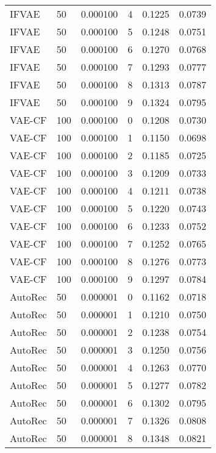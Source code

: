 \begin{tabular}{llrlrr}
   IFVAE &   50 &  0.000100 &     4 &  0.1225 &       0.0739 \\
   IFVAE &   50 &  0.000100 &     5 &  0.1248 &       0.0751 \\
   IFVAE &   50 &  0.000100 &     6 &  0.1270 &       0.0768 \\
   IFVAE &   50 &  0.000100 &     7 &  0.1293 &       0.0777 \\
   IFVAE &   50 &  0.000100 &     8 &  0.1313 &       0.0787 \\
   IFVAE &   50 &  0.000100 &     9 &  0.1324 &       0.0795 \\
  VAE-CF &  100 &  0.000100 &     0 &  0.1208 &       0.0730 \\
  VAE-CF &  100 &  0.000100 &     1 &  0.1150 &       0.0698 \\
  VAE-CF &  100 &  0.000100 &     2 &  0.1185 &       0.0725 \\
  VAE-CF &  100 &  0.000100 &     3 &  0.1209 &       0.0733 \\
  VAE-CF &  100 &  0.000100 &     4 &  0.1211 &       0.0738 \\
  VAE-CF &  100 &  0.000100 &     5 &  0.1220 &       0.0743 \\
  VAE-CF &  100 &  0.000100 &     6 &  0.1233 &       0.0752 \\
  VAE-CF &  100 &  0.000100 &     7 &  0.1252 &       0.0765 \\
  VAE-CF &  100 &  0.000100 &     8 &  0.1276 &       0.0773 \\
  VAE-CF &  100 &  0.000100 &     9 &  0.1297 &       0.0784 \\
 AutoRec &   50 &  0.000001 &     0 &  0.1162 &       0.0718 \\
 AutoRec &   50 &  0.000001 &     1 &  0.1210 &       0.0750 \\
 AutoRec &   50 &  0.000001 &     2 &  0.1238 &       0.0754 \\
 AutoRec &   50 &  0.000001 &     3 &  0.1250 &       0.0756 \\
 AutoRec &   50 &  0.000001 &     4 &  0.1263 &       0.0770 \\
 AutoRec &   50 &  0.000001 &     5 &  0.1277 &       0.0782 \\
 AutoRec &   50 &  0.000001 &     6 &  0.1302 &       0.0795 \\
 AutoRec &   50 &  0.000001 &     7 &  0.1326 &       0.0808 \\
 AutoRec &   50 &  0.000001 &     8 &  0.1348 &       0.0821 \\

\end{tabular}
